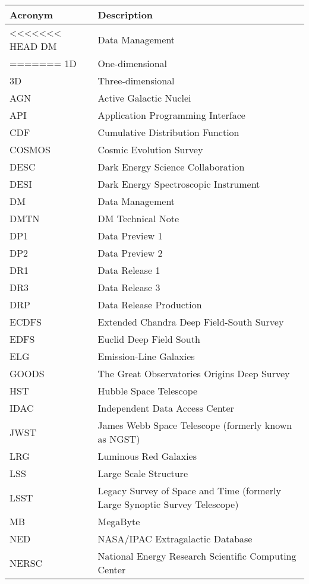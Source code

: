 \addtocounter{table}{-1}
\begin{longtable}{p{}p{}}\hline
\textbf{Acronym} & \textbf{Description}  \\\hline

<<<<<<< HEAD
DM & Data Management \\\hline
=======
1D & One-dimensional \\\hline
3D & Three-dimensional \\\hline
AGN & Active Galactic Nuclei \\\hline
API & Application Programming Interface \\\hline
CDF & Cumulative Distribution Function \\\hline
COSMOS & Cosmic Evolution Survey \\\hline
DESC & Dark Energy Science Collaboration \\\hline
DESI & Dark Energy Spectroscopic Instrument \\\hline
DM & Data Management \\\hline
DMTN & DM Technical Note \\\hline
DP1 & Data Preview 1 \\\hline
DP2 & Data Preview 2 \\\hline
DR1 & Data Release 1 \\\hline
DR3 & Data Release 3 \\\hline
DRP & Data Release Production \\\hline
ECDFS & Extended Chandra Deep Field-South Survey \\\hline
EDFS & Euclid Deep Field South \\\hline
ELG & Emission-Line Galaxies \\\hline
GOODS & The Great Observatories Origins Deep Survey \\\hline
HST & Hubble Space Telescope \\\hline
IDAC & Independent Data Access Center \\\hline
JWST & James Webb Space Telescope (formerly known as NGST) \\\hline
LRG & Luminous Red Galaxies \\\hline
LSS & Large Scale Structure \\\hline
LSST & Legacy Survey of Space and Time (formerly Large Synoptic Survey Telescope) \\\hline
MB & MegaByte \\\hline
NED & NASA/IPAC Extragalactic Database \\\hline
NERSC & National Energy Research Scientific Computing Center \\\hline

\end{longtable}
